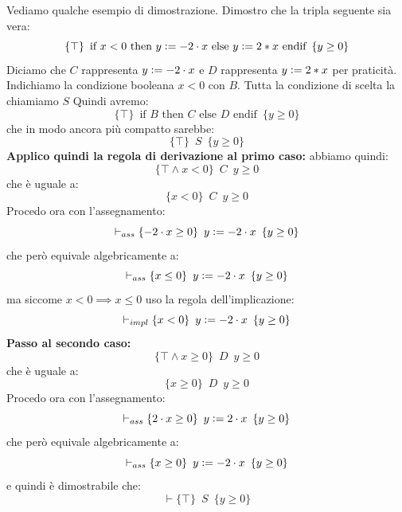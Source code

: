 \begin{esempio}
	Vediamo qualche esempio di dimostrazione. Dimostro che la tripla seguente sia
	vera:
	\[\{\top\}\,\,\,\mbox{if } x<0 \mbox{ then }y\cceq -2\cdot x \mbox{ else }
		y\cceq 2*x\mbox{ endif}\,\,\,\{y\geq 0\}\]
		Diciamo che $C$ rappresenta $y\cceq -2\cdot x$ e $D$ rappresenta $y\cceq 2*x$
		per praticità. Indichiamo la condizione booleana $x<0$ con $B$. Tutta la
		condizione di scelta la chiamiamo $S$
		Quindi avremo:
		\[\{\top\}\,\,\,\mbox{if } B \mbox{ then }C\mbox{ else }
			D \mbox{ endif}\,\,\,\{y\geq 0\}\]
			che in modo ancora più compatto sarebbe:
			\[\{\top\}\,\,\, S\,\,\,\{y\geq 0\}\]
			\textbf{Applico quindi la regola di derivazione al primo caso:}
			abbiamo quindi:
			\[\{\top \land x<0\}\,\,\, C\,\,\,{y\geq 0}\]
			che è uguale a:
			\[\{x<0\}\,\,\, C\,\,\,{y\geq 0}\]
			Procedo ora con l'assegnamento:
			\[\vdash_{ass}\{-2\cdot x\geq 0\}\,\,\, y\cceq -2\cdot x\,\,\,\{y\geq 0\}\]
			che però equivale algebricamente a:
			\[\vdash_{ass}\{x\leq 0\}\,\,\, y\cceq -2\cdot x\,\,\,\{y\geq 0\}\]
			ma siccome $x<0 \implies x\leq 0$ uso la regola dell'implicazione:
			\[\vdash_{impl}\{x< 0\}\,\,\, y\cceq -2\cdot x\,\,\,\{y\geq 0\}\]
			\textbf{Passo al secondo caso:}
			\[\{\top \land x\geq 0\}\,\,\, D\,\,\,{y\geq 0}\]
			che è uguale a:
			\[\{x\geq 0\}\,\,\, D\,\,\,{y\geq 0}\]
			Procedo ora con l'assegnamento:
			\[\vdash_{ass}\{2\cdot x\geq 0\}\,\,\, y\cceq 2\cdot x\,\,\,\{y\geq 0\}\]
			che però equivale algebricamente a:
			\[\vdash_{ass}\{x\geq 0\}\,\,\, y\cceq -2\cdot x\,\,\,\{y\geq 0\}\]
			e quindi è dimostrabile che:
			\[\vdash \{\top\}\,\,\, S\,\,\,\{y\geq 0\}\]
			\end{esempio}
